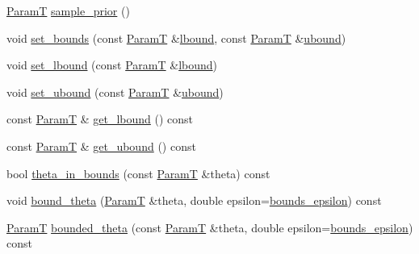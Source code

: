 \begin{DoxyCompactItemize}
\item 
\hyperlink{classmappel_1_1PointEmitterModel_a665ec6aea3aac139bb69a23c06d4b9a1}{ParamT} \hyperlink{classmappel_1_1PointEmitterModel_a481a8021b13918c01f7ff5b657418227}{sample\+\_\+prior} ()
\item 
void \hyperlink{classmappel_1_1PointEmitterModel_a31f139d9eb58f210f3359a9f5be9dd15}{set\+\_\+bounds} (const \hyperlink{classmappel_1_1PointEmitterModel_a665ec6aea3aac139bb69a23c06d4b9a1}{ParamT} \&\hyperlink{classmappel_1_1PointEmitterModel_a889bc82f74cfa654da121e5770296ab2}{lbound}, const \hyperlink{classmappel_1_1PointEmitterModel_a665ec6aea3aac139bb69a23c06d4b9a1}{ParamT} \&\hyperlink{classmappel_1_1PointEmitterModel_a35b883e84b6a2e0093bdf482c623beef}{ubound})
\item 
void \hyperlink{classmappel_1_1PointEmitterModel_a737fa5857415b9830fa2e5ccdff48541}{set\+\_\+lbound} (const \hyperlink{classmappel_1_1PointEmitterModel_a665ec6aea3aac139bb69a23c06d4b9a1}{ParamT} \&\hyperlink{classmappel_1_1PointEmitterModel_a889bc82f74cfa654da121e5770296ab2}{lbound})
\item 
void \hyperlink{classmappel_1_1PointEmitterModel_a7363961cc405e585b39e81a7ad85c8d6}{set\+\_\+ubound} (const \hyperlink{classmappel_1_1PointEmitterModel_a665ec6aea3aac139bb69a23c06d4b9a1}{ParamT} \&\hyperlink{classmappel_1_1PointEmitterModel_a35b883e84b6a2e0093bdf482c623beef}{ubound})
\item 
const \hyperlink{classmappel_1_1PointEmitterModel_a665ec6aea3aac139bb69a23c06d4b9a1}{ParamT} \& \hyperlink{classmappel_1_1PointEmitterModel_aeb486e8f6f6fa694e3746e84eebcf848}{get\+\_\+lbound} () const 
\item 
const \hyperlink{classmappel_1_1PointEmitterModel_a665ec6aea3aac139bb69a23c06d4b9a1}{ParamT} \& \hyperlink{classmappel_1_1PointEmitterModel_a0dfb473c48d177a4540d328abb03cd55}{get\+\_\+ubound} () const 
\item 
bool \hyperlink{classmappel_1_1PointEmitterModel_ad50dfc29b6e7167fb4caf8683353079d}{theta\+\_\+in\+\_\+bounds} (const \hyperlink{classmappel_1_1PointEmitterModel_a665ec6aea3aac139bb69a23c06d4b9a1}{ParamT} \&theta) const 
\item 
void \hyperlink{classmappel_1_1PointEmitterModel_a789dfcc9ea1df17a0282fca5705ade85}{bound\+\_\+theta} (\hyperlink{classmappel_1_1PointEmitterModel_a665ec6aea3aac139bb69a23c06d4b9a1}{ParamT} \&theta, double epsilon=\hyperlink{classmappel_1_1PointEmitterModel_ac987a119137b85a27704b1c40e3fab8c}{bounds\+\_\+epsilon}) const 
\item 
\hyperlink{classmappel_1_1PointEmitterModel_a665ec6aea3aac139bb69a23c06d4b9a1}{ParamT} \hyperlink{classmappel_1_1PointEmitterModel_ac342b21db8970dfa0b2809ffe5e73d06}{bounded\+\_\+theta} (const \hyperlink{classmappel_1_1PointEmitterModel_a665ec6aea3aac139bb69a23c06d4b9a1}{ParamT} \&theta, double epsilon=\hyperlink{classmappel_1_1PointEmitterModel_ac987a119137b85a27704b1c40e3fab8c}{bounds\+\_\+epsilon}) const 

\end{DoxyCompactItemize}
